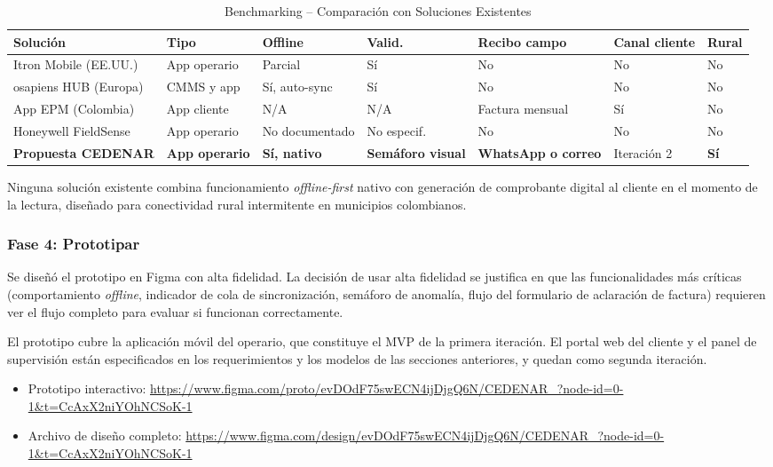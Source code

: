 \documentclass[12pt, a4paper]{article}
\begin{document}
\begin{table}[H]
  \caption{Benchmarking -- Comparación con Soluciones Existentes}
  \label{tab:benchmarking}
  \centering
  \scriptsize
  \begin{tabularx}{\textwidth}{p{2.8cm} p{2cm} X X X X p{1.4cm}}
    \toprule
    \textbf{Solución} & \textbf{Tipo} & \textbf{Offline} & \textbf{Valid.} & \textbf{Recibo campo} & \textbf{Canal cliente} & \textbf{Rural} \\
    \midrule
    Itron Mobile (EE.UU.) & App operario & Parcial & Sí & No & No & No \\
    osapiens HUB (Europa) & CMMS y app & Sí, auto-sync & Sí & No & No & No \\
    App EPM (Colombia) & App cliente & N/A & N/A & Factura mensual & Sí & No \\
    Honeywell FieldSense & App operario & No documentado & No especif. & No & No & No \\
    \textbf{Propuesta CEDENAR} & \textbf{App operario} & \textbf{Sí, nativo} & \textbf{Semáforo visual} & \textbf{WhatsApp o correo} & Iteración 2 & \textbf{Sí} \\
    \bottomrule
  \end{tabularx}
\end{table}

\noindent Ninguna solución existente combina funcionamiento \textit{offline-first} nativo con generación de comprobante digital al cliente en el momento de la lectura, diseñado para conectividad rural intermitente en municipios colombianos.

\subsubsection{Fase 4: Prototipar}

\noindent Se diseñó el prototipo en Figma con alta fidelidad. La decisión de usar alta fidelidad se justifica en que las funcionalidades más críticas (comportamiento \textit{offline}, indicador de cola de sincronización, semáforo de anomalía, flujo del formulario de aclaración de factura) requieren ver el flujo completo para evaluar si funcionan correctamente.

\noindent El prototipo cubre la aplicación móvil del operario, que constituye el MVP de la primera iteración. El portal web del cliente y el panel de supervisión están especificados en los requerimientos y los modelos de las secciones anteriores, y quedan como segunda iteración.

\begin{itemize}
  \item Prototipo interactivo: \url{https://www.figma.com/proto/evDOdF75swECN4ijDjgQ6N/CEDENAR_?node-id=0-1&t=CcAxX2niYOhNCSoK-1}
  \item Archivo de diseño completo: \url{https://www.figma.com/design/evDOdF75swECN4ijDjgQ6N/CEDENAR_?node-id=0-1&t=CcAxX2niYOhNCSoK-1}
\end{itemize}
\end{document}
